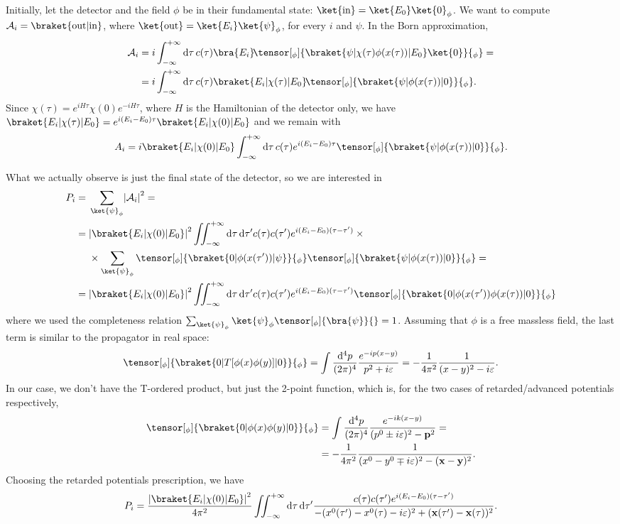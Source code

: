 \documentclass[a4paper,12pt]{book}
\DeclarePairedDelimiter{\abs}{\lvert}{\rvert}
\renewcommand{\vec}{\mathbf}
\newcommand{\dd}{\mathop{\mathrm{d}\!}{}}
\renewcommand{\epsilon}{\varepsilon}
\theoremstyle{definition}
\theoremstyle{remark}
\begin{document}
Initially, let the detector and the field $\phi$ be in their fundamental state: $\ket{\text{in}}=\ket{E_0}\ket{0}_\phi$. We want to compute $\mathcal A_i=\braket{\text{out}|\text{in}}$, where $\ket{\text{out}}=\ket{E_i}\ket{\psi}_\phi$, for every $i$ and $\psi$. In the Born approximation,
\begin{align*}
\mathcal A_i&=i\int_{-\infty}^{+\infty}\dd\tau\,c(\tau) \bra{E_i}\!\tensor[_\phi]{\braket{\psi|\chi(\tau)\phi(x(\tau))|E_0}\ket{0}}{_\phi}=\\
&=i\int_{-\infty}^{+\infty}\dd\tau\,c(\tau)\braket{E_i|\chi(\tau)|E_0}\!\tensor[_\phi]{\braket{\psi|\phi(x(\tau))|0}}{_\phi}.
\end{align*}
Since $\chi(\tau)=e^{iH\tau}\chi(0)e^{-iH\tau}$, where $H$ is the Hamiltonian of the detector only, we have $\braket{E_i|\chi(\tau)|E_0}=e^{i(E_i-E_0)\tau}\braket{E_i|\chi(0)|E_0}$ and we remain with
\[A_i=i\braket{E_i|\chi(0)|E_0}\int_{-\infty}^{+\infty}\dd\tau\,c(\tau)e^{i(E_i-E_0)\tau}\tensor[_\phi]{\braket{\psi|\phi(x(\tau))|0}}{_\phi}.\]

What we actually observe is just the final state of the detector, so we are interested in
\begin{align*}
P_i={}&\sum_{\ket{\psi}_\phi}\abs*{\mathcal A_i}^2=\\
={}&\abs*{\braket{E_i|\chi(0)|E_0}}^2\iint_{-\infty}^{+\infty}\dd\tau\dd\tau'c(\tau)c(\tau')e^{i(E_i-E_0)(\tau-\tau')}\times{}\\
&\times\sum_{\ket{\psi}_\phi}\tensor[_\phi]{\braket{0|\phi(x(\tau'))|\psi}}{_\phi}\tensor[_\phi]{\braket{\psi|\phi(x(\tau))|0}}{_\phi}=\\
={}&\abs*{\braket{E_i|\chi(0)|E_0}}^2\iint_{-\infty}^{+\infty}\dd\tau\dd\tau'c(\tau)c(\tau')e^{i(E_i-E_0)(\tau-\tau')}\tensor[_\phi]{\braket{0|\phi(x(\tau'))\phi(x(\tau))|0}}{_\phi}
\end{align*}
where we used the completeness relation $\sum_{\ket{\psi}_\phi}\ket{\psi}_\phi\tensor[_\phi]{\bra{\psi}}{}=1$. Assuming that $\phi$ is a free massless field, the last term is similar to the propagator in real space:
\[\tensor[_\phi]{\braket{0|T[\phi(x)\phi(y)]|0}}{_\phi}=\int\frac{\dd^4p}{(2\pi)^4}\frac{e^{-ip(x-y)}}{p^2+i\epsilon}=-\frac1{4\pi^2}\frac1{(x-y)^2-i\epsilon}.\]
In our case, we don't have the T-ordered product, but just the 2-point function, which is, for the two cases of retarded/advanced potentials respectively,
\begin{align*}
\tensor[_\phi]{\braket{0|\phi(x)\phi(y)|0}}{_\phi}&=\int\frac{\dd^4p}{(2\pi)^4}\frac{e^{-ik(x-y)}}{(p^0\pm i\epsilon)^2-\vec p^2}=\\
&=-\frac1{4\pi^2}\frac1{(x^0-y^0\mp i\epsilon)^2-(\vec x-\vec y)^2}.
\end{align*}
Choosing the retarded potentials prescription, we have
\[P_i=\frac{\abs*{\braket{E_i|\chi(0)|E_0}}^2}{4\pi^2}\iint_{-\infty}^{+\infty}\dd\tau\dd\tau'\frac{c(\tau)c(\tau')e^{i(E_i-E_0)(\tau-\tau')}}{-(x^0(\tau')-x^0(\tau)-i\epsilon)^2+(\vec x(\tau')-\vec x(\tau))^2}.\]
\end{document}
